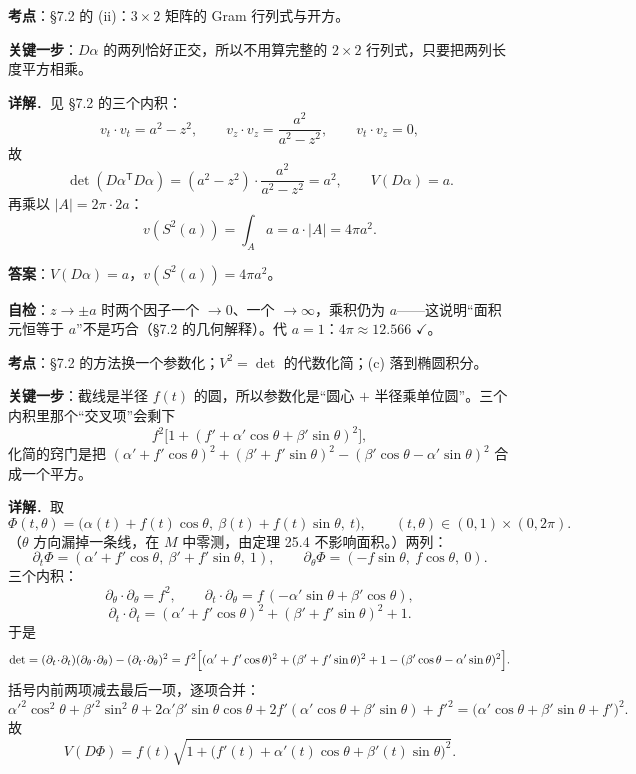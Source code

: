 \documentclass[11pt]{ctexart}
\renewcommand{\qbreak}{\needspace{0.22\textheight}}
\newcommand{\Vvol}{V}
\begin{document}
\textbf{考点}：§7.2 的 (ii)：$3\times2$ 矩阵的 Gram 行列式与开方。

\textbf{关键一步}：$D\alpha$ 的两列恰好正交，所以不用算完整的 $2\times2$ 行列式，只要把两列长度平方相乘。

\textbf{详解}．见 §7.2 的三个内积：
\[ v_t\!\cdot\! v_t=a^2-z^2,\qquad v_z\!\cdot\! v_z=\frac{a^2}{a^2-z^2},\qquad v_t\!\cdot\! v_z=0, \]
故
\[ \det(D\alpha^{\mathsf T}D\alpha)=(a^2-z^2)\cdot\frac{a^2}{a^2-z^2}=a^2,\qquad \Vvol(D\alpha)=a. \]
再乘以 $|A|=2\pi\cdot2a$：
\[ v(S^2(a))=\int_Aa=a\cdot|A|=4\pi a^2. \]

\textbf{答案}：$\Vvol(D\alpha)=a$，$v(S^2(a))=4\pi a^2$。

\textbf{自检}：$z\to\pm a$ 时两个因子一个 $\to0$、一个 $\to\infty$，乘积仍为 $a$——这说明“面积元恒等于 $a$”不是巧合（§7.2 的几何解释）。代 $a=1$：$4\pi\approx12.566$ $\checkmark$。

\qbreak
{}\label{ax8}

\textbf{考点}：§7.2 的方法换一个参数化；$\Vvol^2=\det$ 的代数化简；(c) 落到椭圆积分。

\textbf{关键一步}：截线是半径 $f(t)$ 的圆，所以参数化是“圆心 $+$ 半径乘单位圆”。三个内积里那个“交叉项”会剩下
\[ f^2\bigl[1+(f'+\alpha'\cos\theta+\beta'\sin\theta)^2\bigr], \]
化简的窍门是把 $(\alpha'+f'\cos\theta)^2+(\beta'+f'\sin\theta)^2-(\beta'\cos\theta-\alpha'\sin\theta)^2$ 合成一个平方。

\textbf{详解}．取
\[ \Phi(t,\theta)=\bigl(\alpha(t)+f(t)\cos\theta,\ \beta(t)+f(t)\sin\theta,\ t\bigr),\qquad (t,\theta)\in(0,1)\times(0,2\pi). \]
（$\theta$ 方向漏掉一条线，在 $M$ 中零测，由定理 25.4 不影响面积。）两列：
\[ \partial_t\Phi=(\alpha'+f'\cos\theta,\ \beta'+f'\sin\theta,\ 1),\qquad \partial_\theta\Phi=(-f\sin\theta,\ f\cos\theta,\ 0). \]
三个内积：
\[ \partial_\theta\!\cdot\!\partial_\theta=f^2,\qquad \partial_t\!\cdot\!\partial_\theta=f\,(-\alpha'\sin\theta+\beta'\cos\theta), \]
\[ \partial_t\!\cdot\!\partial_t=(\alpha'+f'\cos\theta)^2+(\beta'+f'\sin\theta)^2+1. \]
于是
\[ \det=(\partial_t\!\cdot\!\partial_t)(\partial_\theta\!\cdot\!\partial_\theta)-(\partial_t\!\cdot\!\partial_\theta)^2
=f^2\Bigl[(\alpha'+f'\cos\theta)^2+(\beta'+f'\sin\theta)^2+1-(\beta'\cos\theta-\alpha'\sin\theta)^2\Bigr]. \]
括号内前两项减去最后一项，逐项合并：
\[ \alpha'^2\cos^2\theta+\beta'^2\sin^2\theta+2\alpha'\beta'\sin\theta\cos\theta+2f'(\alpha'\cos\theta+\beta'\sin\theta)+f'^2
=\bigl(\alpha'\cos\theta+\beta'\sin\theta+f'\bigr)^2. \]
故
\[ \Vvol(D\Phi)=f(t)\sqrt{1+\bigl(f'(t)+\alpha'(t)\cos\theta+\beta'(t)\sin\theta\bigr)^2}. \]
\end{document}
